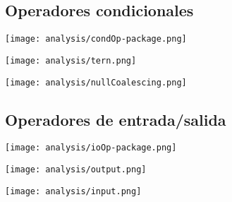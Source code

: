\subsection {Operadores condicionales} 
\begin{center}
\texttt{[image: analysis/condOp-package.png]} 
\end{center}

\begin{multicols}{2}
\begin{center}
\texttt{[image: analysis/tern.png]} 
\end{center}
\columnbreak
\begin{center}
\texttt{[image: analysis/nullCoalescing.png]} 
\end{center}
\end{multicols}


\subsection {Operadores de entrada/salida} 
\begin{center}
\texttt{[image: analysis/ioOp-package.png]} 
\end{center}

\pagebreak
\begin{multicols}{2}
\begin{center}
\texttt{[image: analysis/output.png]} 
\end{center}
\columnbreak
\begin{center}
\texttt{[image: analysis/input.png]} 
\end{center}
\end{multicols}

